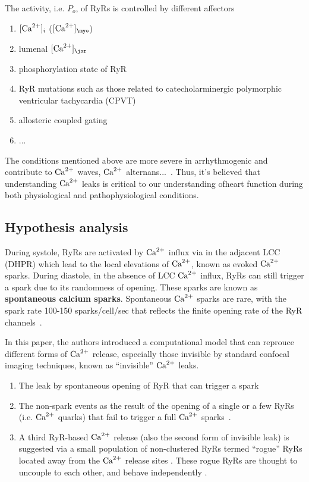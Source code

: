 The activity, i.e. $P_o$, of RyRs is controlled by different affectors
\begin{enumerate}
\item $[{\text{Ca}^{2+}}]_i$ ($[\Ca]_\myo$)

\item lumenal $[\Ca]_\jsr$~\citep{qin2008}

\item phosphorylation state of RyR

\item RyR mutations such as those related to catecholarminergic
  polymorphic ventricular tachycardia (CPVT)

\item allosteric coupled gating~\citep{marx2001}

\item ...
\end{enumerate}
The conditions mentioned above are more severe in 
arrhythmogenic and contribute to ${\text{Ca}^{2+}}$ waves, ${\text{Ca}^{2+}}$
alternans...~\citep{Wehrens2005}. Thus, it's believed that
understanding ${\text{Ca}^{2+}}$ leaks is critical to our understanding ofheart
function during both physiological and pathophysiological conditions. 

\subsection{Hypothesis analysis}
\label{sec:hypothesis-analysis-17}


During systole, RyRs are activated by ${\text{Ca}^{2+}}$ influx via in the adjacent
LCC (DHPR) which lead to the local elevations of ${\text{Ca}^{2+}}$, known as
evoked ${\text{Ca}^{2+}}$ sparks. During diastole, in the absence of LCC ${\text{Ca}^{2+}}$
influx, RyRs can still trigger a spark due to its randomness of
opening. These sparks are known as {\bf spontaneous calcium 
  sparks}.
Spontaneous ${\text{Ca}^{2+}}$ sparks are rare, with the spark rate 100-150 sparks/cell/sec
that reflects the finite opening rate of the RyR channels~\citep{cheng1993cse}. 

In this paper, the authors introduced a computational model that can
reprouce different forms of ${\text{Ca}^{2+}}$ release, especially those invisible by
standard confocal imaging techniques, known as ``invisible'' ${\text{Ca}^{2+}}$ leaks. 
\begin{enumerate}
  \item The leak by spontaneous opening of RyR that can trigger a spark
  \item The non-spark events as the result of  the opening of a single or a few
  RyRs (i.e. ${\text{Ca}^{2+}}$ quarks) that fail to  trigger a full ${\text{Ca}^{2+}}$
  sparks~\citep{brochet2011}.
   \item A third RyR-based ${\text{Ca}^{2+}}$ release (also the second form of invisible
leak) is suggested via a small population of non-clustered RyRs termed
``rogue'' RyRs located away from the ${\text{Ca}^{2+}}$ release sites
\citep{sobie2006, lukyanenko2007}. These rogue RyRs are thought to
uncouple to each other, and behave independently \citep{xie2010drr}. 
\end{enumerate}

